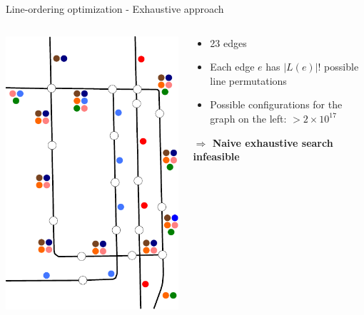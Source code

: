 \documentclass{beamer}
\begin{document}
\begin{frame}{Line-ordering optimization - Exhaustive approach}
	\begin{columns}[T]
		\begin{column}{0.3\textwidth}
			\centering\includegraphics[width=1\textwidth]{figures/chicago_linegraph.pdf}
		\end{column}
		\pause
		\begin{column}[T]{0.7\textwidth}			
			\begin{itemize}[<+->]
				\item 23 edges
				\item Each edge $e$ has $|L(e)|!$ possible line permutations
				\item Possible configurations for the graph on the left: \alert{$> 2\times 10^{17}$}
			\end{itemize}

			\pause[\thebeamerpauses]
			\vspace{.5cm}
			\textbf{$\Rightarrow$ Naive exhaustive search infeasible}
		\end{column}
	\end{columns}
\end{frame}
\end{document}
